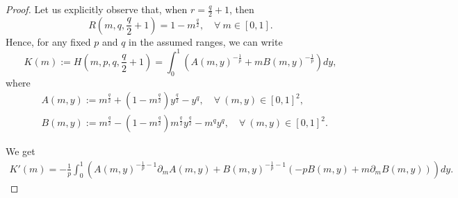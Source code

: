 \documentclass{amsart}
\theoremstyle{definition}
\theoremstyle{remark}
\begin{document}
\begin{proof} 
Let us explicitly observe that, when $r=\frac q2+1$, then
\[
R\left(m,q,\frac q2+1\right)=1-m^\frac q2,\quad\forall \ {m\in[0,1]}.
\]
Hence, for any fixed $p$ and $q$ in the assumed ranges, we can write 
\begin{equation}
\label{Kdef}
K(m):=H\left(m,p,q,\frac q2+1\right)=\int_0^1 \left(A(m,y)^{-\frac 1p}+mB(m,y)^{-\frac 1p}\right)dy,
\end{equation}
where
\begin{align*}
&A(m,y):= m^\frac q 2 +(1-m^\frac q2)y^{\frac q2}-y^q,\quad\forall\ {(m,y)\in[0,1]^2},\\
&B(m,y):= m^\frac q 2-(1-m^\frac q2)m^\frac q 2 y^\frac q2-m^q y^q,\quad\forall \ {(m,y)\in[0,1]^2}.
\end{align*}

We get
\begin{multline*}
K'(m)=-\frac 1 p\int_0^1 \left(A(m,y)^{-\frac 1p-1}\partial_m A(m,y)+ B(m,y)^{-\frac 1p-1}\left(-p B(m,y)+m\partial_m B(m,y)\right)\right)dy.
\end{multline*}


\end{proof}
\end{document}
